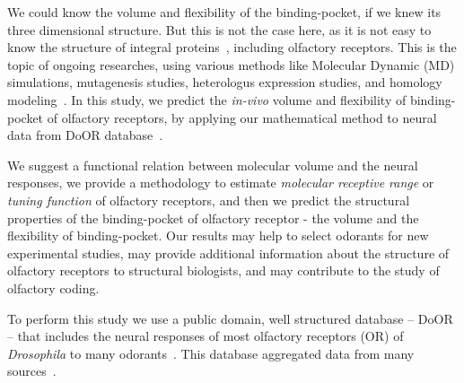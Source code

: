 \documentclass[11pt]{paper} %
\begin{document}
We could know the volume and flexibility of the binding-pocket, 
if we knew its three dimensional structure.
But this is not the case here, 
as it is not easy to know the structure of integral proteins~\cite{Zhang2008,Lupieri2009}, 
including olfactory receptors. 
This is the topic of ongoing researches, 
using various methods like Molecular Dynamic (MD) simulations, 
mutagenesis studies, heterologus expression studies, and homology modeling~\cite{Khafizov2007,Man2004,Lai2005,Vaidehi2002,Floriano2004,Schmiedeberg2007,Katada2005,Kato2008,Rospars2013}.
In this study, we predict the {\it in-vivo} volume and flexibility of binding-pocket of olfactory receptors, by applying our mathematical method to neural data from DoOR database~\cite{Galizia2010}. 

We suggest a functional relation between molecular volume and the neural responses, 
we provide a methodology to estimate {\it molecular receptive range} or {\it tuning function} of olfactory receptors,
and then we predict the structural properties of the binding-pocket of olfactory receptor - the volume and the flexibility of binding-pocket.
Our results may help to select odorants  for new experimental studies, 
may provide additional information about the structure of olfactory receptors to structural biologists, 
and may contribute to the study of olfactory coding.

To perform this study we use a public domain, 
well structured database -- DoOR -- 
that includes the neural responses of most olfactory receptors (OR) of \textit{Drosophila} to many odorants~\cite{Galizia2010}. 
This database aggregated data from many sources~\cite{Bruyne1999,Bruyne2001,Dobritsa2003,Goldman2005,Hallem2004,Hallem2006,
Kreher2005,Kreher2008,Kwon2007,Pelz2006,Pelz2006,Schmuker2007,Stensmyr2003,
Turner2009,VanderGoesvanNaters2007,Yao2005}.





\end{document}
